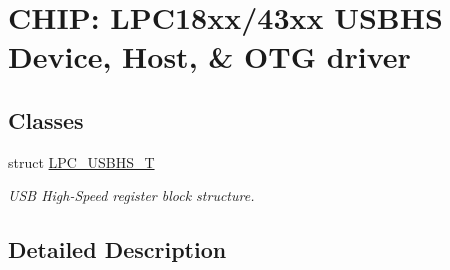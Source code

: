\hypertarget{group___u_s_b_h_s__18_x_x__43_x_x}{}\section{C\+H\+IP\+: L\+P\+C18xx/43xx U\+S\+B\+HS Device, Host, \& O\+TG driver}
\label{group___u_s_b_h_s__18_x_x__43_x_x}
\subsection*{Classes}
\begin{DoxyCompactItemize}
\item 
struct \hyperlink{struct_l_p_c___u_s_b_h_s___t}{L\+P\+C\+\_\+\+U\+S\+B\+H\+S\+\_\+T}
\begin{DoxyCompactList}\small\item\em U\+SB High-\/\+Speed register block structure. \end{DoxyCompactList}\end{DoxyCompactItemize}


\subsection{Detailed Description}
